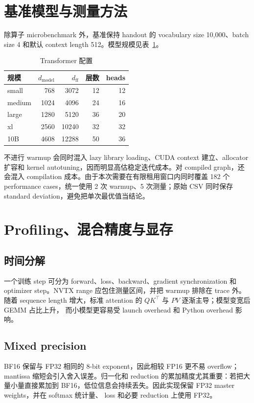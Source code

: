 \documentclass[11pt,a4paper]{ctexart}
\begin{document}
\section{基准模型与测量方法}
除算子 microbenchmark 外，基准保持 handout 的 vocabulary size 10,000、batch size 4
和默认 context length 512。模型规模见表~\ref{tab:model-config}。
\begin{table}[htbp]\centering
\caption{Transformer 配置}\label{tab:model-config}
\begin{tabular}{lrrrr}
\toprule
规模 & $d_{\mathrm{model}}$ & $d_{\mathrm{ff}}$ & 层数 & heads\\
\midrule
small & 768 & 3072 & 12 & 12\\
medium & 1024 & 4096 & 24 & 16\\
large & 1280 & 5120 & 36 & 20\\
xl & 2560 & 10240 & 32 & 32\\
10B & 4608 & 12288 & 50 & 36\\
\bottomrule
\end{tabular}
\end{table}

不进行 warmup 会同时混入 lazy library loading、CUDA context 建立、allocator 扩容和
kernel autotuning，因而明显高估稳定迭代成本。对 compiled graph，还会混入 compilation
成本。由于本次需要在有限租用窗口内同时覆盖 182 个 performance cases，统一使用
2 次 warmup、5 次测量；原始 CSV 同时保存 standard deviation，避免把单次最优值当结论。

\section{Profiling、混合精度与显存}
\subsection{时间分解}
一个训练 step 可分为 forward、loss、backward、gradient synchronization 和 optimizer
step。NVTX range 应包住测量区间，并把 warmup 排除在 trace 外。随着 sequence length
增大，标准 attention 的 $QK^\top$ 与 $PV$ 逐渐主导；模型变宽后 GEMM 占比上升，
而小模型更容易受 launch overhead 和 Python overhead 影响。

\subsection{Mixed precision}
BF16 保留与 FP32 相同的 8-bit exponent，因此相较 FP16 更不易 overflow；mantissa
缩短会引入舍入误差。归一化和 reduction 的累加精度尤其重要：若把大量小量直接累加到
BF16，低位信息会持续丢失。因此实现保留 FP32 master weights，并在 softmax 统计量、
loss 和必要 reduction 上使用 FP32。
\end{document}
